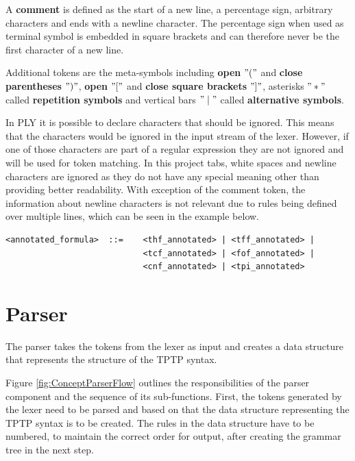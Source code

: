 A \textbf{comment} is defined as the start of a new line, a percentage sign, arbitrary characters and ends with a newline character.
The percentage sign when used as terminal symbol is embedded in square brackets and can therefore never be the first character of a new line.

Additional tokens are the meta-symbols including \textbf{open} $"("$ and \textbf{close parentheses} $")"$, \textbf{open} $"["$ and \textbf{close square brackets} $"]"$, asterisks $"*"$ called \textbf{repetition symbols} and vertical bars $"\mid"$ called \textbf{alternative symbols}.

In PLY it is possible to declare characters that should be ignored. This means that the characters would be ignored in the input stream of the lexer. However, if one of those characters are part of a regular expression they are not ignored and will be used for token matching. In this project tabs, white spaces and newline characters are ignored as they do not have any special meaning other than providing better readability. With exception of the comment token, the information about newline characters is not relevant due to rules being defined over multiple lines, which can be seen in the example below.
\begin{verbatim}
<annotated_formula>  ::=    <thf_annotated> | <tff_annotated> |
                            <tcf_annotated> | <fof_annotated> |
                            <cnf_annotated> | <tpi_annotated>
\end{verbatim}


\section{Parser}\label{sec:ConceptParser}
The parser takes the tokens from the lexer as input and creates a data structure that represents the structure of the \ac{TPTP} syntax.

Figure \ref{fig:ConceptParserFlow} outlines the responsibilities of the parser component and the sequence of its sub-functions.
First, the tokens generated by the lexer need to be parsed and based on that the data structure representing the \ac{TPTP} syntax is to be created.
The rules in the data structure have to be numbered, to maintain the correct order for output, after creating the grammar tree in the next step.

